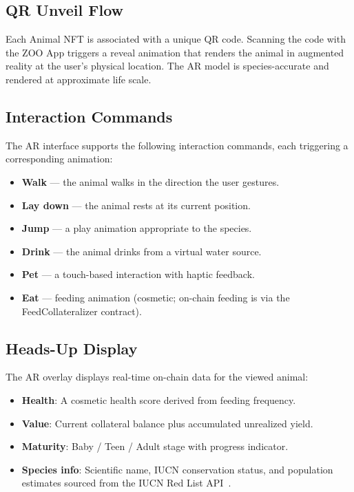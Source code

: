 \documentclass[11pt,letterpaper]{article}
\begin{document}
\subsection{QR Unveil Flow}

Each Animal NFT is associated with a unique QR code.  Scanning the code with the ZOO
App triggers a reveal animation that renders the animal in augmented reality at the
user's physical location.  The AR model is species-accurate and rendered at approximate
life scale.

\subsection{Interaction Commands}

The AR interface supports the following interaction commands, each triggering a
corresponding animation:

\begin{itemize}
    \item \textbf{Walk} --- the animal walks in the direction the user gestures.
    \item \textbf{Lay down} --- the animal rests at its current position.
    \item \textbf{Jump} --- a play animation appropriate to the species.
    \item \textbf{Drink} --- the animal drinks from a virtual water source.
    \item \textbf{Pet} --- a touch-based interaction with haptic feedback.
    \item \textbf{Eat} --- feeding animation (cosmetic; on-chain feeding is via the
          FeedCollateralizer contract).
\end{itemize}

\subsection{Heads-Up Display}

The AR overlay displays real-time on-chain data for the viewed animal:

\begin{itemize}
    \item \textbf{Health}: A cosmetic health score derived from feeding frequency.
    \item \textbf{Value}: Current collateral balance plus accumulated unrealized yield.
    \item \textbf{Maturity}: Baby / Teen / Adult stage with progress indicator.
    \item \textbf{Species info}: Scientific name, IUCN conservation status, and
          population estimates sourced from the IUCN Red List API~\cite{iucn2021}.
\end{itemize}
\end{document}
